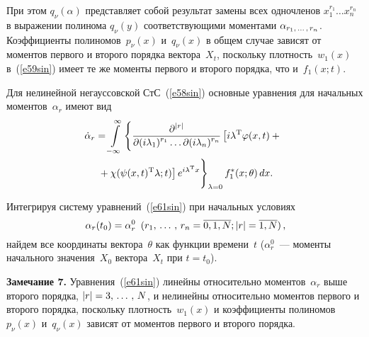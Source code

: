 \begin{multicols}{2}
При этом $q_\nu (\alpha)$ представляет собой результат замены всех
одночленов $x_1^{r_1} \ldots x_n^{r_n}$ в выражении полинома
$q_\nu (y)$ соответствующими моментами $\alpha_{r_1,\,\ldots\,,\, r_n}$.
Коэффициенты полиномов~$p_\nu(x)$ и~$q_\nu (x)$ в общем случае
зависят от моментов первого и второго порядка вектора~$X_t$,
поскольку плотность~$w_1 (x)$ в~(\ref{e59sin}) имеет те же моменты
первого и второго порядка, что и~$f_1 (x;t)$.

Для нелинейной  негауссовской СтС~(\ref{e58sin}) основные уравнения для
начальных моментов~$\alpha_r$ имеют вид~\cite{7sin, 8sin}
\begin{multline}
{\dot     \alpha}_r =\iii_{-\infty}^\infty
    \left \{\fr{\partial^{\vert r\vert}}{
    \partial (i\lambda_1)^{r_1}\ldots \partial
    (i\lambda_n)^{r_n}} 
\left [ i\lambda^{\mathrm{T}} \varphi(x,t) +{}\right.\right.\\
\left.\left.{}+\chi(\psi(x,t)^{\mathrm{T}} \lambda;t)\right ] e^{i\lambda^{\mathrm{T}} x}
    \vphantom{\fr{\partial^{\vert r\vert}}{
    \partial (i\lambda_1)^{r_1}\ldots \partial
    (i\lambda_n)^{r_n}} }
    \right\}_{\lambda=0} f_1^*
    (x;\theta)\,dx.
    \label{e61sin}
    \end{multline}

Интегрируя систему уравнений~(\ref{e61sin}) при начальных условиях
\begin{equation*}
\alpha_r (t_0) = \alpha^0_r\enskip (r_1,\,\ldots\,,\, r_n =\overline{0,1,N}; \vert r\vert
    =\overline{1, N})\,,\!
    \end{equation*}
найдем все координаты вектора~$\theta$ как функции времени~$t$
($\alpha^0_r$~--- моменты начального значения~$X_0$ вектора~$X_t$
при $t=t_0$).

\smallskip

\noindent
\textbf{Замечание 7.} Уравнения~(\ref{e61sin}) линейны относительно моментов~$\alpha_r$ 
выше второго порядка, $\vert r\vert =3,\,\ldots\,,\, N$, и нелинейны
относительно моментов первого и второго порядка, поскольку
плотность~$w_1 (x)$ и коэффициенты полиномов~$p_\nu(x)$ и~$q_\nu (x)$ 
зависят от моментов первого и второго порядка.

\begin{table*}[b]\small
\vspace*{-12pt}
\begin{center}
\vspace*{2ex}


\end{center}
\end{table*}
\end{multicols}
